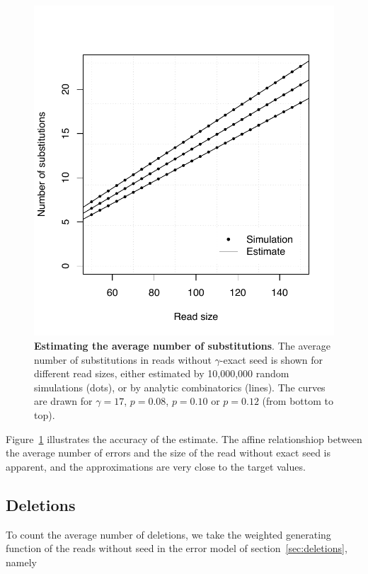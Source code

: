 \documentclass{article}
\begin{document}
\begin{figure}[h]
\centering
\includegraphics[scale=0.445]{simulp-average.pdf}
\caption{\textbf{Estimating the average number of substitutions}. The
average number of substitutions in reads without $\gamma$-exact seed is
shown for different read sizes, either estimated by 10,000,000 random
simulations (dots), or by analytic combinatorics (lines). The curves are
drawn for $\gamma=17$, $p=0.08$, $p=0.10$ or $p=0.12$ (from bottom to
top).}
\label{fig:simulavsub}
\end{figure}

Figure~\ref{fig:simulavsub} illustrates the accuracy of the estimate. The
affine relationshiop between the average number of errors and the size of
the read without exact seed is apparent, and the approximations are very
close to the target values.




\subsection{Deletions}
\label{sec:avdel}

To count the average number of deletions, we take the weighted generating
function of the reads without seed in the error model of
section~\ref{sec:deletions}, namely
\end{document}
